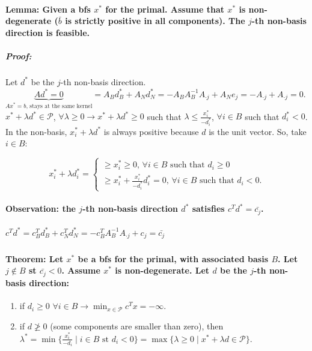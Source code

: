\documentclass[main]{subfiles}
\begin{document}
\paragraph{Lemma: Given a bfs $x^*$ for the primal. Assume that $x^*$ is
non-degenerate ($\bar{b}$ is strictly positive in all components).
The $j$-th non-basis direction is feasible.}

\subparagraph{Proof:}
Let $d^*$ be the $j$-th non-basis direction. $\underbrace{Ad^* = 0}_{Ax^* = b
\text{, stays at the same kernel}} = A_B d^*_B + A_N d^*_N =
-A_B A^{-1}_B A_{\cdot j} + A_N e_j = -A_{\cdot j} + A_{\cdot j } = 0$.\\

$x^* + \lambda d^* \in \mathcal{P}$, $\forall \lambda \geq 0 \rightarrow
x^* + \lambda d^* \geq 0$ such that $\lambda \leq \frac{x^*_i}{-d^*_i}$,
$\forall i \in B$ such that $d^*_i < 0$.\\

In the non-basis,  $x^*_i + \lambda d^*$ is always positive because $d$ is the
unit vector. So, take $i \in B$:

\[
  x^*_i + \lambda d^*_i =
  \left\{
	\begin{array}{ll}
    \geq x^*_i \geq 0 \text{, }\forall i \in B \text{ such that }d_i \geq 0\\
	\geq x^*_i + \frac{x^*_i}{-d^*_i} d^*_i = 0 \text{, } \forall i \in B
	\text{ such that } d_i < 0.
    \end{array}
  \right.
\]

\paragraph{Observation: the $j$-th non-basis direction $d^*$ satisfies
$c^T d^* = \bar{c_j}$.}

\subparagraph{$c^T d^* = c^T_B d^*_B + c^T_N d^*_N = -c^T_B A^{-1}_B
A_{\cdot j} + c_j = \bar{c_j}$}

\paragraph{Theorem: Let $x^*$ be a bfs for the primal, with associated basis
$B$. Let $j \notin B$ st $\bar{c_j} < 0$. Assume $x^*$ is non-degenerate.
Let $d$ be the $j$-th non-basis direction:}
\begin{enumerate}
\item if $d_i \geq 0$ $\forall i \in B \rightarrow \displaystyle \min_{x
\in \mathcal{P}} c^{T} x = -\infty$.
\item if $d \ngeq 0$ (some components are smaller than zero),
then $\lambda^* = \min \{\frac{x^*_i}{-d_i} \mid i \in B \text{ st } d_i < 0 \}
= \max \{\lambda \geq 0 \mid x^* + \lambda d \in \mathcal{P} \}$.
\end{enumerate}
\end{document}
